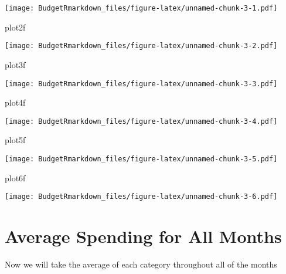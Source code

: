 \documentclass[
]{article}
\newenvironment{Shaded}{\begin{snugshade}}{\end{snugshade}}
\newcommand{\NormalTok}[1]{#1}
\begin{document}
\texttt{[image: BudgetRmarkdown\_files/figure-latex/unnamed-chunk-3-1.pdf]}

\begin{Shaded}
\begin{Highlighting}[]
\NormalTok{plot2f}
\end{Highlighting}
\end{Shaded}

\texttt{[image: BudgetRmarkdown\_files/figure-latex/unnamed-chunk-3-2.pdf]}

\begin{Shaded}
\begin{Highlighting}[]
\NormalTok{plot3f}
\end{Highlighting}
\end{Shaded}

\texttt{[image: BudgetRmarkdown\_files/figure-latex/unnamed-chunk-3-3.pdf]}

\begin{Shaded}
\begin{Highlighting}[]
\NormalTok{plot4f}
\end{Highlighting}
\end{Shaded}

\texttt{[image: BudgetRmarkdown\_files/figure-latex/unnamed-chunk-3-4.pdf]}

\begin{Shaded}
\begin{Highlighting}[]
\NormalTok{plot5f}
\end{Highlighting}
\end{Shaded}

\texttt{[image: BudgetRmarkdown\_files/figure-latex/unnamed-chunk-3-5.pdf]}

\begin{Shaded}
\begin{Highlighting}[]
\NormalTok{plot6f}
\end{Highlighting}
\end{Shaded}

\texttt{[image: BudgetRmarkdown\_files/figure-latex/unnamed-chunk-3-6.pdf]}

\hypertarget{average-spending-for-all-months}{%
\section{Average Spending for All
Months}\label{average-spending-for-all-months}}

Now we will take the average of each category throughout all of the
months
\end{document}
